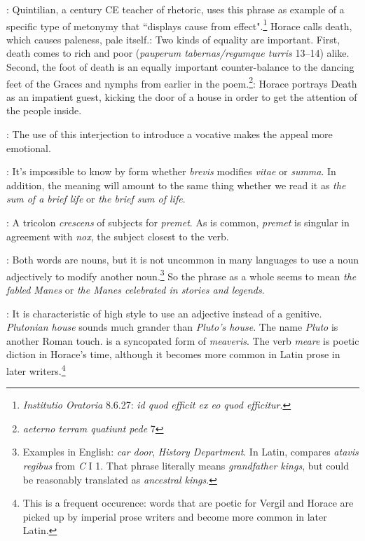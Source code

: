 
: Quintilian, a  century CE teacher of rhetoric, uses this phrase as example of a specific type of metonymy that ``displays cause from effect".\footnote{\textit{Institutio Oratoria} 8.6.27: \textit{id quod efficit ex eo quod efficitur}.}  Horace calls death, which causes paleness, pale itself.\indent{}: Two kinds of equality are important. First, death comes to rich and poor (\textit{pauperum tabernas/regumque turris} 13--14) alike.  Second, the foot of death is an equally important counter-balance to the dancing feet of the Graces and nymphs from earlier in the poem.\footnote{\textit{aeterno terram quatiunt pede} 7}\indent{}: Horace portrays Death as an impatient guest, kicking the door of a house in order to get the attention of the people inside.


: The use of this interjection to introduce a vocative makes the appeal more emotional.


: It's impossible to know by form whether \textit{brevis} modifies \textit{vitae} or \textit{summa}.  In addition, the meaning will amount to the same thing whether we read it as \textit{the sum of a brief life} or \textit{the brief sum of life}.


: A tricolon \textit{crescens} of subjects for \textit{premet}.  As is common, \textit{premet} is singular in agreement with \textit{nox}, the subject closest to the verb.


: Both words are nouns, but it is not uncommon in many languages to use a noun adjectively to modify another noun.\footnote{Examples in English: \textit{car door}, \textit{History Department}. In Latin, \citet[84]{mayer2012} compares \textit{atavis \lips regibus} from \textit{C} I 1.  That phrase literally means \textit{grandfather kings}, but could be reasonably translated as \textit{ancestral kings}.}  So the phrase as a whole seems to mean \textit{the fabled Manes} or \textit{the Manes celebrated in stories and legends}.


: It is characteristic of high style to use an adjective instead of a genitive.  \textit{Plutonian house} sounds much grander than \textit{Pluto's house}.  The name \textit{Pluto} is another Roman touch.\indent{} is a syncopated form of \textit{meaveris}.  The verb \textit{meare} is poetic diction in Horace's time, although it becomes more common in Latin prose in later writers.\footnote{This is a frequent occurence: words that are poetic for Vergil and Horace are picked up by imperial prose writers and become more common in later Latin.}


